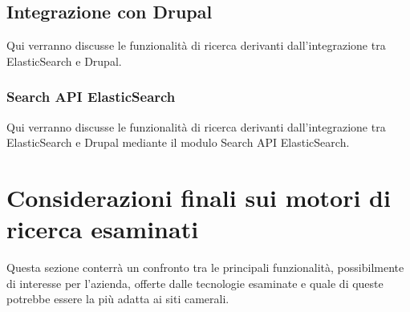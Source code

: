 		\subsection{Integrazione con Drupal}
		Qui verranno discusse le funzionalità di ricerca derivanti dall'integrazione tra ElasticSearch e Drupal.
		
			\subsubsection{Search API ElasticSearch}
			Qui verranno discusse le funzionalità di ricerca derivanti dall'integrazione tra ElasticSearch e Drupal mediante il modulo Search API ElasticSearch.
			
	\section{Considerazioni finali sui motori di ricerca esaminati}
	Questa sezione conterrà un confronto tra le principali funzionalità, possibilmente di interesse per l'azienda, offerte dalle tecnologie esaminate e quale di queste potrebbe essere la più adatta ai siti camerali.